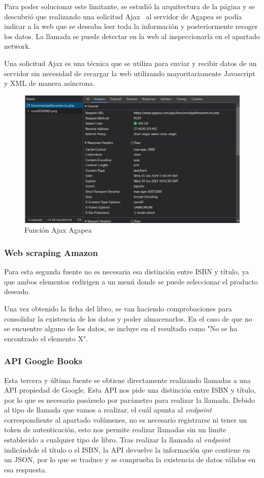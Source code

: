Para poder solucionar este limitante, se estudió la arquitectura de la página y se descubrió que realizando una solicitud Ajax~\cite{Ajax} al servidor de Agapea se podía indicar a la web que se deseaba leer toda la información y posteriormente recoger los datos. La llamada se puede detectar en la web al inspeccionarla en el apartado network.

Una solicitud Ajax es una técnica que se utiliza para enviar y recibir datos de un servidor sin necesidad de recargar la web utilizando mayoritariamente Javascript y XML de manera asíncrona.

\begin{figure}[h]
    \centering
\includegraphics[width=0.9\linewidth]{Imagenes/AgapeaAjax.png}
    \caption{Función Ajax Agapea}
    \label{Función Ajax Agapea}
\end{figure}
\FloatBarrier

\subsubsection{ Web scraping Amazon}
Para esta segunda fuente no es necesaria esa distinción entre ISBN y título, ya que ambos elementos redirigen a un menú donde se puede seleccionar el producto deseado. 

Una vez obtenido la ficha del libro, se van haciendo comprobaciones para consolidar la existencia de los datos y poder almacenarlos. En el caso de que no se encuentre alguno de los datos, se incluye en el resultado como "No se ha encontrado el elemento X".

\subsubsection{API Google Books}
Esta tercera y última fuente se obtiene directamente realizando llamadas a una API propiedad de Google. Esta API nos pide una distinción entre ISBN y título, por lo que es necesario pasárselo por parámetro para realizar la llamada.
Debido al tipo de llamada que vamos a realizar, el cuál apunta al \textit{endpoint} correspondiente al apartado volúmenes, no es necesario registrarse ni tener un token de autenticación, esto nos permite realizar llamadas sin un limite establecido a cualquier tipo de libro.
Tras realizar la llamada al \textit{endpoint} indicándole el título o el ISBN, la API devuelve la información que contiene en un JSON, por lo que se traduce y se comprueba la existencia de datos válidos en esa respuesta.

